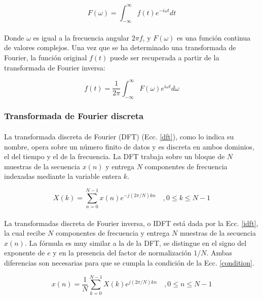 \documentclass[12pt]{article}
\begin{document}
\begin{equation}
F(\omega)=\int_{-\infty}^{\infty}f(t)e^{-i{\omega}t}dt
\end{equation}

\paragraph{}
Donde $\omega$ es igual a la frecuencia angular $2{\pi}f$, y $F(\omega)$ es una función continua de valores complejos. Una vez que se ha determinado una transformada de Fourier, la función original $f(t)$ puede ser recuperada a partir de la transformada de Fourier inversa:

\begin{equation}
f(t)=\frac{1}{2\pi}\int_{-\infty}^{\infty}F(\omega)e^{i{\omega}t}d\omega
\end{equation}

\subsubsection{Transformada de Fourier discreta}

\paragraph{}
La transformada discreta de Fourier (DFT) (Ecc. \ref{dft}), como lo indica su nombre, opera sobre un número finito de datos y es discreta en ambos dominios, el del tiempo y el de la frecuencia. La DFT trabaja sobre un bloque de $N$ muestras de la secuencia $x(n)$ y entrega $N$ componentes de frecuencia indexadas mediante la variable entera $k$.

\begin{equation}
\label{dft}
X(k) = \sum_{n=0}^{N-1}x(n)e^{-j(2\pi/N)kn} \quad , 0 \leq k \leq N-1
\end{equation}

\paragraph{}
La transformadas discreta de Fourier inversa, o IDFT está dada por la Ecc. \ref{idft}, la cual recibe $N$ componentes de frecuencia y entrega $N$ muestras de la secuencia $x(n)$. La fórmula es muy similar a la de la DFT, se distingue en el signo del exponente de $e$ y en la presencia del factor de normalización $1/N$. Ambas diferencias son necesarias para que se cumpla la condición de la Ecc. \ref{condition}.

\begin{equation}
\label{idft}
x(n)=\frac{1}{N}\sum_{k=0}^{N-1}X(k)e^{j(2\pi/N)kn} \quad ,0 \leq n \leq N-1
\end{equation}
\end{document}
